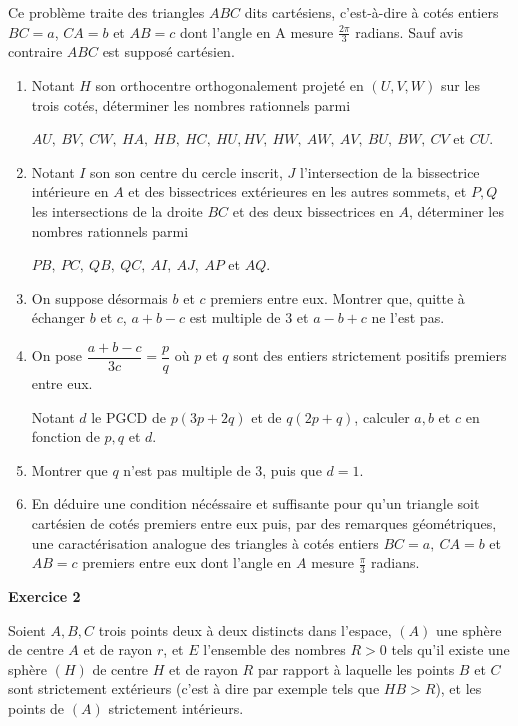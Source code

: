 \documentclass[a4paper,12pt]{article}
\begin{document}
Ce problème traite des triangles $ABC$ dits cartésiens, c'est-à-dire à
cotés entiers $BC = a$, $CA = b$ et $AB = c$ dont l'angle en A mesure
$\frac{2\pi}3$ radians. Sauf avis contraire $ABC $ est supposé cartésien.
\begin{enumerate}
\item Notant $H$ son orthocentre orthogonalement projeté en $(U,V,W)$
	sur les trois cotés, déterminer les nombres rationnels parmi
	\begin{center}
$AU,\: BV,\: CW,\: HA,\: HB,\: HC,\: HU, HV,\: HW,\: AW,\: AV,\: BU,\: BW,\: CV $ et $CU$.
	\end{center}
\item Notant $I$ son son centre du cercle inscrit, $J$ l'intersection de
	la bissectrice intérieure en $A$ et des bissectrices extérieures en les
	autres sommets, et $P, Q $ les intersections de la droite $BC$ et des deux
	bissectrices en $A$, déterminer les nombres rationnels parmi 
	
	\begin{center}$PB,\: PC,\: QB,\:
	QC,\: AI,\: AJ,\: AP$ et $AQ$.\end{center}
	
\item On suppose désormais $b$ et $c$ premiers entre eux. Montrer que,
	quitte à échanger $b$ et $c$, $a + b - c$ est multiple de $3$ et
	$a- b + c$  ne l'est pas.
\item On pose $\dfrac {a + b - c}{3c}=\dfrac pq$ où $p$ et $q$ sont des entiers
	strictement positifs premiers entre eux.
	
Notant $d$ le PGCD de $p(3p + 2q)$
	et de $q(2p + q)$, calculer $a, b$ et $c$ en fonction de $p, q$ et $d$.
\item Montrer que $q$ n'est pas multiple de $3$, puis que $d = 1$.
\item En déduire une condition nécéssaire et suffisante pour qu'un
	triangle soit cartésien de cotés premiers entre eux puis, par des remarques
	géométriques, une caractérisation analogue des triangles à cotés entiers
	$BC = a,\ CA = b$ et $AB = c$ premiers entre eux dont l'angle en $A$ mesure
	$\frac \pi 3$ radians.
\end{enumerate}

\begin{center}\textbf{\color{blue} Exercice 2}
\end{center}

Soient $A, B, C$ trois points deux à deux distincts dans l'espace, $(A)$
une sphère de centre $A$ et de rayon $r$, et $E$ l'ensemble des nombres
$R > 0$ tels qu'il existe une sphère $(H)$ de centre $H$ et de rayon $R$ par
rapport à laquelle les points $B$ et $C$ sont strictement extérieurs
(c'est à dire par exemple tels que $HB > R$), et les points de $(A)$
strictement intérieurs.
\end{document}
